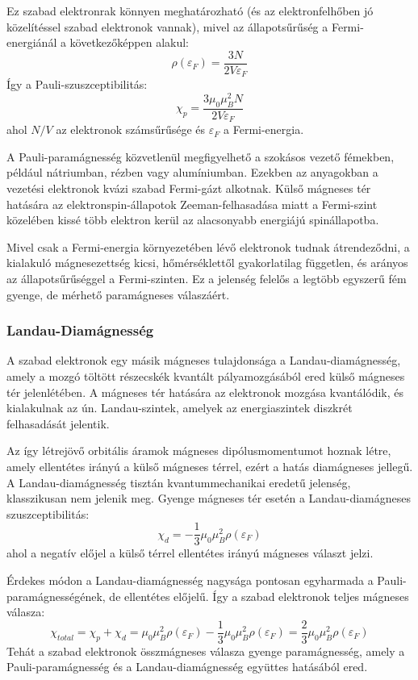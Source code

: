 \documentclass[../main.tex]{subfiles}
\begin{document}
Ez szabad elektronrak könnyen meghatározható (és az elektronfelhőben jó közelítéssel szabad elektronok vannak), mivel az állapotsűrűség a Fermi-energiánál a következőképpen alakul:
\begin{equation}
    \rho(\varepsilon_F) = \frac{3 N}{2 V \varepsilon_F}
\end{equation}
Így a Pauli-szuszceptibilitás:
\begin{equation}
    \boxed{\chi_p = \frac{3 \mu_0 \mu_B^2 N}{2 V \varepsilon_F}}
\end{equation}
ahol $N/V$ az elektronok számsűrűsége és $\varepsilon_F$ a Fermi-energia.

A Pauli-paramágnesség közvetlenül megfigyelhető a szokásos vezető fémekben, például nátriumban, rézben vagy alumíniumban. Ezekben az anyagokban a vezetési elektronok kvázi szabad Fermi-gázt alkotnak.
Külső mágneses tér hatására az elektronspin-állapotok Zeeman-felhasadása miatt a Fermi-szint közelében kissé több elektron kerül az alacsonyabb energiájú spinállapotba.

Mivel csak a Fermi-energia környezetében lévő elektronok tudnak átrendeződni, a kialakuló mágnesezettség kicsi, hőmérséklettől gyakorlatilag független, és arányos az állapotsűrűséggel a Fermi-szinten.
Ez a jelenség felelős a legtöbb egyszerű fém gyenge, de mérhető paramágneses válaszáért.

\subsubsection{Landau-Diamágnesség}
A szabad elektronok egy másik mágneses tulajdonsága a Landau-diamágnesség, amely a mozgó töltött részecskék kvantált pályamozgásából ered külső mágneses tér jelenlétében. A mágneses tér hatására az elektronok mozgása kvantálódik, és kialakulnak az ún. Landau-szintek, amelyek az energiaszintek diszkrét felhasadását jelentik.

Az így létrejövő orbitális áramok mágneses dipólusmomentumot hoznak létre, amely ellentétes irányú a külső mágneses térrel, ezért a hatás diamágneses jellegű. A Landau-diamágnesség tisztán kvantummechanikai eredetű jelenség, klasszikusan nem jelenik meg.
Gyenge mágneses tér esetén a Landau-diamágneses szuszceptibilitás:
\begin{equation}
    \chi_d = -\frac{1}{3} \mu_0 \mu_B^2 \rho(\varepsilon_F)
\end{equation}
ahol a negatív előjel a külső térrel ellentétes irányú mágneses választ jelzi.

Érdekes módon a Landau-diamágnesség nagysága pontosan egyharmada a Pauli-paramágnességének, de ellentétes előjelű. Így a szabad elektronok teljes mágneses válasza:
\begin{equation}
    \chi_{total} = \chi_p + \chi_d = \mu_0 \mu_B^2 \rho(\varepsilon_F) - \frac{1}{3} \mu_0 \mu_B^2 \rho(\varepsilon_F) = \frac{2}{3} \mu_0 \mu_B^2 \rho(\varepsilon_F)
\end{equation}
Tehát a szabad elektronok összmágneses válasza gyenge paramágnesség, amely a Pauli-paramágnesség és a Landau-diamágnesség együttes hatásából ered.
\end{document}
